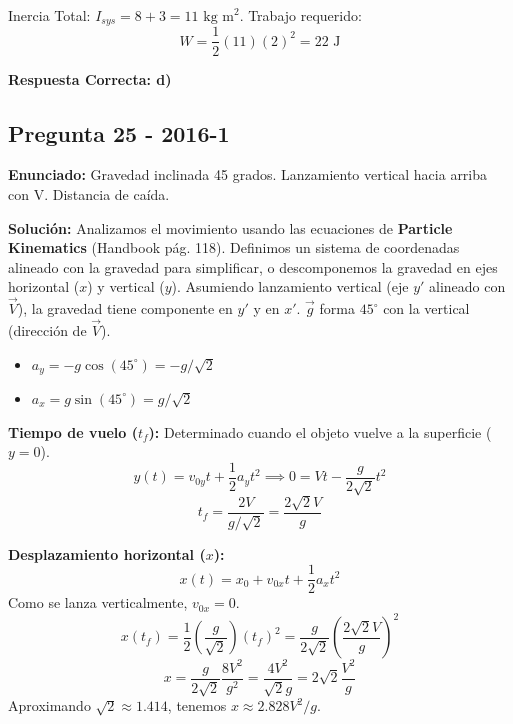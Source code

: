\documentclass{article}
\begin{document}
Inercia Total: $I_{sys} = 8 + 3 = 11 \text{ kg m}^2$.
Trabajo requerido:
$$ W = \frac{1}{2} (11) (2)^2 = 22 \text{ J} $$

\noindent{}

\textbf{Respuesta Correcta: d)}

\vspace{0.5cm}

\subsection*{Pregunta 25 - 2016-1}
\textbf{Enunciado:} Gravedad inclinada 45 grados. Lanzamiento vertical hacia arriba con V. Distancia de caída.

\textbf{Solución:}
Analizamos el movimiento usando las ecuaciones de \textbf{Particle Kinematics} (Handbook pág. 118).
Definimos un sistema de coordenadas alineado con la gravedad para simplificar, o descomponemos la gravedad en ejes horizontal ($x$) y vertical ($y$).
Asumiendo lanzamiento vertical (eje $y'$ alineado con $\vec{V}$), la gravedad tiene componente en $y'$ y en $x'$.
$\vec{g}$ forma $45^\circ$ con la vertical (dirección de $\vec{V}$).
\begin{itemize}
    \item $a_y = -g \cos(45^\circ) = -g/\sqrt{2}$
    \item $a_x = g \sin(45^\circ) = g/\sqrt{2}$
\end{itemize}

\textbf{Tiempo de vuelo ($t_f$):} Determinado cuando el objeto vuelve a la superficie ($y=0$).
$$ y(t) = v_{0y} t + \frac{1}{2} a_y t^2 \implies 0 = V t - \frac{g}{2\sqrt{2}} t^2 $$
$$ t_f = \frac{2 V}{g/\sqrt{2}} = \frac{2\sqrt{2} V}{g} $$

\textbf{Desplazamiento horizontal ($x$):}
$$ x(t) = x_0 + v_{0x} t + \frac{1}{2} a_x t^2 $$
Como se lanza verticalmente, $v_{0x} = 0$.
$$ x(t_f) = \frac{1}{2} \left( \frac{g}{\sqrt{2}} \right) (t_f)^2 = \frac{g}{2\sqrt{2}} \left( \frac{2\sqrt{2} V}{g} \right)^2 $$
$$ x = \frac{g}{2\sqrt{2}} \frac{8 V^2}{g^2} = \frac{4 V^2}{\sqrt{2} g} = 2\sqrt{2} \frac{V^2}{g} $$
Aproximando $\sqrt{2} \approx 1.414$, tenemos $x \approx 2.828 V^2/g$.
\end{document}
